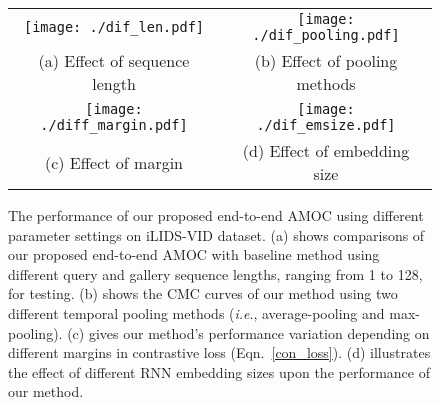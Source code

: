 \documentclass[journal]{IEEEtran}
\begin{document}
 
 \begin{figure}[htb]
 	\begin{center}
 		\begin{tabular}{cc}
 			{\hspace{-3pt}}
 			\texttt{[image: ./dif\_len.pdf]}	&
 				\texttt{[image: ./dif\_pooling.pdf]}\\
 			{\footnotesize{(a) Effect of sequence length }} &
 		{\footnotesize{(b) Effect of pooling methods}} \\
 			\texttt{[image: ./diff\_margin.pdf]}&
 			\texttt{[image: ./dif\_emsize.pdf]}
 			\\
 		
 				{\footnotesize{(c) Effect of margin}}&
 				 {\footnotesize{(d) Effect of embedding size}}
 			
 		\end{tabular}
 	\end{center}
 	\caption{The performance of our proposed end-to-end AMOC using different parameter settings on iLIDS-VID dataset. (a) shows comparisons of our proposed end-to-end AMOC with baseline method\cite{mclaughlinrecurrent} using different query and gallery sequence lengths, ranging from 1 to 128, for testing. (b) shows the CMC curves of our method using two different temporal pooling methods (\textit{i.e}.,  average-pooling and max-pooling). (c) gives our method's performance variation depending on different margins in contrastive loss (Eqn.~\eqref{con_loss}). (d) illustrates the effect of different RNN embedding sizes upon the performance of our method.}
 	
 	\label{fig:ana_fig}
 	\vspace{-1em}
 \end{figure}
 
\end{document}
